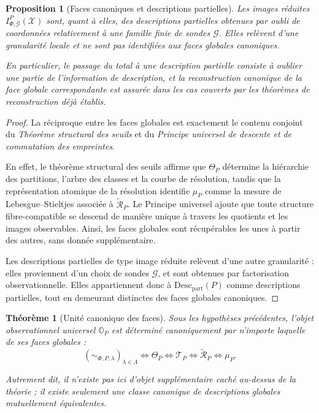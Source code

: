 \documentclass[11pt,a4paper]{article}
\newtheorem{proposition}{Proposition}
\newtheorem{theorem}{Théorème}
\begin{document}
\begin{appendices}
\begin{proposition}[Faces canoniques et descriptions partielles]
Les images réduites \(I_{\Phi,\mathcal G}^P(\mathcal X)\) sont, quant à elles, des descriptions partielles obtenues par oubli de coordonnées relativement à une famille finie de sondes \(\mathcal G\). Elles relèvent d'une granularité locale et ne sont pas identifiées aux faces globales canoniques.

En particulier, le passage du total à une description partielle consiste à oublier une partie de l'information de description, et la reconstruction canonique de la face globale correspondante est assurée dans les cas couverts par les théorèmes de reconstruction déjà établis.
\end{proposition}

\begin{proof}
La réciproque entre les faces globales est exactement le contenu conjoint du \emph{Théorème structural des seuils} et du \emph{Principe universel de descente et de commutation des empreintes}.

En effet, le théorème structural des seuils affirme que \(\Theta_P\) détermine la hiérarchie des partitions, l'arbre des classes et la courbe de résolution, tandis que la représentation atomique de la résolution identifie \(\mu_P\) comme la mesure de Lebesgue--Stieltjes associée à \(\widetilde{\mathcal R}_P\). Le Principe universel ajoute que toute structure fibre-compatible se descend de manière unique à travers les quotients et les images observables. Ainsi, les faces globales sont récupérables les unes à partir des autres, sans donnée supplémentaire.

Les descriptions partielles de type image réduite relèvent d'une autre granularité : elles proviennent d'un choix de sondes \(\mathcal G\), et sont obtenues par factorisation observationnelle. Elles appartiennent donc à \(\mathrm{Desc}_{\mathrm{part}}(P)\) comme descriptions partielles, tout en demeurant distinctes des faces globales canoniques.
\end{proof}

\begin{theorem}[Unité canonique des faces]
Sous les hypothèses précédentes, l'objet observationnel universel \(\mathbb O_P\) est déterminé canoniquement par n'importe laquelle de ses faces globales :
\[
(\sim_{\Phi,P,\lambda})_{\lambda\in\Lambda}
\Longleftrightarrow
\Theta_P
\Longleftrightarrow
\mathcal T_P
\Longleftrightarrow
\widetilde{\mathcal R}_P
\Longleftrightarrow
\mu_P.
\]

Autrement dit, il n'existe pas ici d'objet supplémentaire caché au-dessus de la théorie ; il existe seulement une classe canonique de descriptions globales mutuellement équivalentes.


\end{theorem}
\end{appendices}
\end{document}
